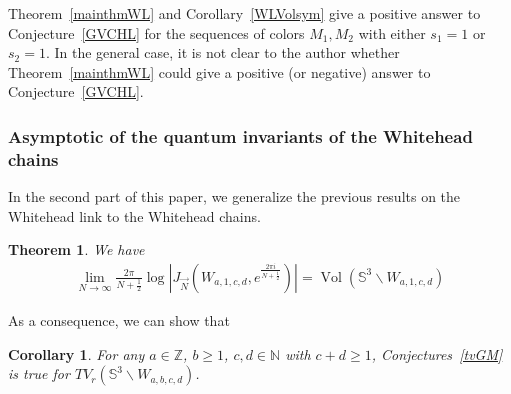 \documentclass[10pt,a4paper]{article}
\newcommand{\lt}{\left}
\newcommand{\rt}{\right}
\def\Vol{\operatorname{Vol}}
\newtheorem{theorem}{Theorem}
\newtheorem{corollary}{Corollary}
\def\SS{{\mathbb S}}
\def\ZZ{{\mathbb Z}}
\def\NN{{\mathbb N}}
\def\Vol{\operatorname{Vol}}
\def \det{\operatorname{det}}
\def \Hess{\operatorname{Hess}}
\begin{document}
Theorem~\ref{mainthmWL} and Corollary~\ref{WLVolsym} give a positive answer to Conjecture~\ref{GVCHL} for the sequences of colors $M_1,M_2$ with either $s_1=1$ or $s_2=1$. In the general case, it is not clear to the author whether Theorem~\ref{mainthmWL} could give a positive (or negative) answer to Conjecture~\ref{GVCHL}. 

\subsubsection{Asymptotic of the quantum invariants of the Whitehead chains}
In the second part of this paper, we generalize the previous results on the Whitehead link to the Whitehead chains. 

\begin{theorem}\label{CJWNN} 
We have
\begin{align*}
\lim_{N\to \infty} \frac{2\pi}{N+\frac{1}{2}} \log| J_{\vec{N}} (W_{a,1,c,d}, e^{\frac{2\pi i}{N+\frac{1}{2}}})| 
= \Vol(\SS^3 \backslash W_{a,1,c,d})
\end{align*}
\end{theorem}

As a consequence, we can show that
\begin{corollary}\label{TVW}For any $a\in \ZZ$, $b\geq 1$, $c,d \in \NN$ with $c+d\geq 1$, 
Conjectures~\ref{tvGM} is true for $TV_r(\SS^3\backslash W_{a,b,c,d})$.
\end{corollary}
\end{document}
